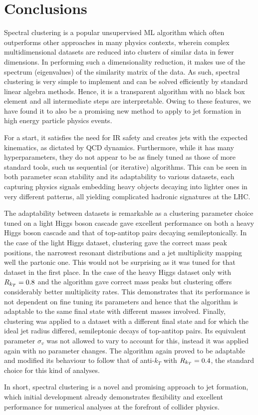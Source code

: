 \section{Conclusions}

Spectral clustering is a popular unsupervised ML algorithm which often outperforms other approaches in many physics contexts, wherein complex multidimensional datasets are reduced into clusters of similar data in fewer dimensions. In performing such a dimensionality reduction, it makes use of the spectrum (eigenvalues) of the similarity matrix of the data.  As such, spectral clustering is very simple to implement and can be solved efficiently by standard linear algebra methods. 
Hence,  it is a transparent algorithm with no black box element and all intermediate steps are interpretable. 
Owing to these features,  we have found it to also be 
a promising new method to apply to jet formation in high energy particle physics events.

For a start, it satisfies the need for IR safety and creates jets with the expected kinematics, as dictated by QCD dynamics. Furthermore, 
while it has many hyperparameters, they do not appear to be as finely tuned as those of more standard tools, such us sequential (or iterative) \genkt{} algorithms.
This can be seen in both parameter scan stability and its adaptability to various datasets, each capturing physics signals embedding heavy objects decaying into lighter ones in very different patterns, all yielding complicated hadronic signatures at the LHC.

The adaptability between datasets is remarkable as a \spectral{} clustering parameter choice tuned on a light Higgs boson cascade
gave excellent performance on both a heavy Higgs boson cascade and that of top-antitop pairs decaying semileptonically.
In the case of the light Higgs dataset, \spectral{} clustering gave the correct mass peak positions, the narrowest resonant distributions and a jet multiplicity mapping well the partonic one. This would not be surprising as it was tuned for that dataset in the first place.
In the case of the heavy Higgs dataset only \antikt{} with \(R_{k_T}{} = 0.8\) 
and the \spectral{} algorithm gave correct mass peaks but  \spectral{} clustering offers considerably better multiplicity rates.
This demonstrates that its performance is not dependent on fine tuning its parameters and hence that the algorithm is adaptable to the same final state with different masses involved.
Finally, \spectral{} clustering was applied to a dataset with a different final state and 
for which the ideal jet radius differed, semileptonic decays of top-antitop pairs.
Its equivalent parameter \(\sigma_v\) was not allowed to vary to account for this, instead it was applied again with no parameter changes.
The algorithm again proved to be adaptable and modified its behaviour to follow that of anti-$k_T$ with \(R_{k_T}{} = 0.4\), the standard choice for this kind of analyses.

In short, spectral clustering is a novel and promising approach to jet formation, which initial development already demonstrates flexibility and excellent performance for numerical analyses at the forefront of collider physics.


